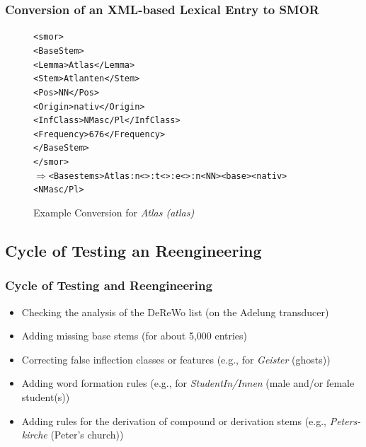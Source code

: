 \documentclass {beamer}
\begin{document}
\frame
{ \frametitle{Conversion of an XML-based Lexical Entry to SMOR}

\begin{figure}
\begin{alltt}
<smor>\\
\hspace{1cm}<BaseStem>\\
\hspace{2cm}<Lemma>Atlas</Lemma>\\ 
\hspace{2cm}<Stem>Atlanten</Stem>\\
\hspace{2cm}<Pos>NN</Pos>\\
\hspace{2cm}<Origin>nativ</Origin>\\
\hspace{2cm}<InfClass>NMasc/Pl</InfClass>\\
\hspace{2cm}<Frequency>676</Frequency>\\
\hspace{1cm}</BaseStem>\\
</smor>\\
$\Rightarrow$<Basestems>Atlas:n<>:t<>:e<>:n<NN><base><nativ><NMasc/Pl>
\end{alltt}  

\caption{Example Conversion for \emph{Atlas (atlas)} }
\end{figure}
}

\subsection{Cycle of Testing an Reengineering}

\frame
{ \frametitle{Cycle of Testing and Reengineering }
\begin{itemize} 
\item Checking the analysis of the DeReWo list (on the Adelung transducer)
\item Adding missing base stems (for about 5,000 entries)
\item Correcting false inflection classes or features (e.g., for \emph{Geister} (ghosts)) 
\item Adding word formation rules (e.g., for \emph{StudentIn/Innen} (male and/or female student(s))
\item Adding rules for the derivation of compound or derivation stems (e.g., \emph{Peters-kirche} (Peter's church))
\end{itemize}
}
\end{document}
